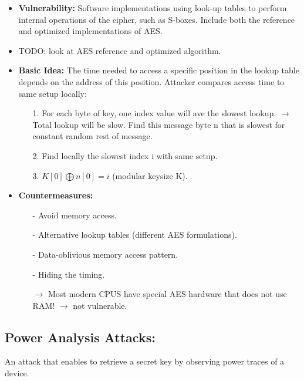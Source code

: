 \begin{itemize}
    \item\textbf{Vulnerability: }Software implementations using look-up tables to perform internal operations of the cipher, such as S-boxes. Include both the reference and optimized implementations of AES.
    \item TODO: look at AES reference and optimized algorithm.
    \item\textbf{Basic Idea: }The time needed to access a specific position in the lookup table depends on the address of this position. Attacker compares access time to same setup locally:
    \begin{itemize}
        \item[1.]For each byte of key, one index value will ave the slowest lookup. $\rightarrow$ Total lookup will be slow. Find this message byte n that is slowest for constant random rest of message. 
        \item[2.]Find locally the slowest index i with same setup. 
        \item[3.]$K[0] \bigoplus n[0] = i$ (modular keysize K).
    \end{itemize}{}
    \item\textbf{Countermeasures: }
    \begin{itemize}
        \item[-]Avoid memory access.
        \item[-]Alternative lookup tables (different AES formulations).
        \item[-]Data-oblivious memory access pattern.
        \item[-]Hiding the timing.
        \item[$\rightarrow$]Most modern CPUS have special AES hardware that does not use RAM! $\rightarrow$ not vulnerable.
    \end{itemize}{}
\end{itemize}{}

\subsection{Power Analysis Attacks: }
An attack that enables to retrieve a secret key by observing power traces of a device.

